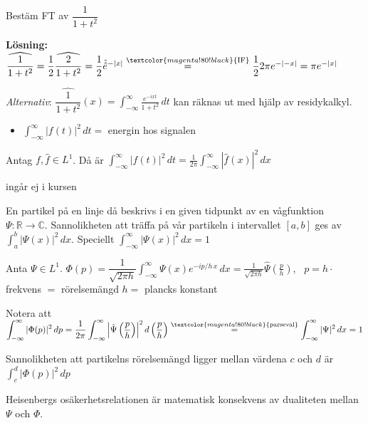 \begin{example}
Bestäm FT av $\dfrac{1}{1 + t^2}$

\textbf{Lösning:} $\widehat{\dfrac{1}{1 + t^2}} = \dfrac{1}{2} \widehat{\dfrac{2}{1 + t^2}} = \dfrac{1}{2} \hat{\hat{e}}^{-|x|} \overset{\textcolor{magenta!80!black}{\text{IF}}}{=} \dfrac{1}{2} 2\pi e^{-|-x|} = \pi e^{-|x|}$

\emph{Alternativ}: $\widehat{\dfrac{1}{1 + t^2}}(x) = \displaystyle\int_{-\infty}^\infty \frac{e^{-ixt}}{1 + t^2}\,dt$ kan räknas ut med hjälp av residykalkyl.
\end{example}
\begin{itemize}
  \item $\displaystyle\int_{-\infty}^\infty |f(t)|^2\,dt = $ energin hos signalen
\end{itemize}

\begin{theorem}
Antag $f, \hat{f} \in L^1$. Då är $\displaystyle\int_{-\infty}^\infty |f(t)|^2\,dt = \frac{1}{2\pi} \int_{-\infty}^\infty |\hat{f}(x)|^2\,dx$
\end{theorem}

\begin{framed}
\hfill \textcolor{magenta!80!black}{ingår ej i kursen}

En partikel på en linje då beskrivs i en given tidpunkt av en vågfunktion $\Psi : \mathbb{R} \to \mathbb{C}$. Sannolikheten att träffa på vår partikeln i intervallet $[a, b]$ ges av $\int_a^b |\Psi(x)|^2\,dx$. Speciellt $\int_{-\infty}^\infty |\Psi(x)|^2\,dx = 1$

Anta $\Psi \in L^1$. $\Phi(p) = \dfrac{1}{\sqrt{2\pi h}} \displaystyle\int_{-\infty}^\infty \Psi(x)e^{-ip/h\,x}\,dx = \frac{1}{\sqrt{2\pi h}} \hat{\Psi}\left( \frac{p}{h} \right)$, \ $p = h \cdot$ frekvens $=$ rörelsemängd \quad \textcolor{magenta!80!black}{$h = $ plancks konstant}

Notera att $\displaystyle\int_{-\infty}^\infty |\Phi(p)|^2\,dp = \frac{1}{2\pi} \int_{-\infty}^\infty \left| \hat{\Psi}\left( \frac{p}{h} \right) \right|^2 d\left( \frac{p}{h} \right) \overset{\textcolor{magenta!80!black}{\text{parseval}}}{=} \int_{-\infty}^\infty |\Psi|^2\,dx = 1$

Sannolikheten att partikelns rörelsemängd ligger mellan värdena $c$ och $d$ är $\int_c^d |\Phi(p)|^2\,dp$

Heisenbergs osäkerhetsrelationen är matematisk konsekvens av dualiteten mellan $\Psi$ och $\Phi$.
\end{framed}

